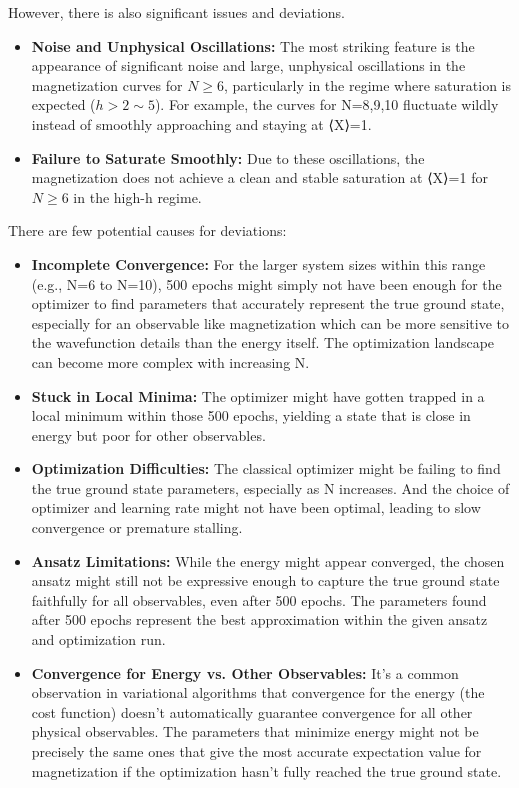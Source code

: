 \documentclass[a4paper]{article}
\begin{document}
However, there is also significant issues and deviations. 
\begin{itemize}
    \item \textbf{Noise and Unphysical Oscillations:} The most striking feature is the appearance of significant noise and large, unphysical oscillations in the magnetization curves for $N\geq 6$, particularly in the regime where saturation is expected ($h>2\sim5$). For example, the curves for N=8,9,10 fluctuate wildly instead of smoothly approaching and staying at ⟨X⟩=1.
    \item \textbf{Failure to Saturate Smoothly:} Due to these oscillations, the magnetization does not achieve a clean and stable saturation at ⟨X⟩=1 for $N\geq6$ in the high-h regime.
\end{itemize}

There are few potential causes for deviations: 
\begin{itemize}
    \item \textbf{Incomplete Convergence:} For the larger system sizes within this range (e.g., N=6 to N=10), 500 epochs might simply not have been enough for the optimizer to find parameters that accurately represent the true ground state, especially for an observable like magnetization which can be more sensitive to the wavefunction details than the energy itself. The optimization landscape can become more complex with increasing N.
    \item \textbf{Stuck in Local Minima:} The optimizer might have gotten trapped in a local minimum within those 500 epochs, yielding a state that is close in energy but poor for other observables.
    \item \textbf{Optimization Difficulties:} The classical optimizer might be failing to find the true ground state parameters, especially as N increases. And the choice of optimizer and learning rate might not have been optimal, leading to slow convergence or premature stalling.
    \item \textbf{Ansatz Limitations:} While the energy might appear converged, the chosen ansatz might still not be expressive enough to capture the true ground state faithfully for all observables, even after 500 epochs. The parameters found after 500 epochs represent the best approximation within the given ansatz and optimization run.
    \item \textbf{Convergence for Energy vs. Other Observables:} It's a common observation in variational algorithms that convergence for the energy (the cost function) doesn't automatically guarantee convergence for all other physical observables. The parameters that minimize energy might not be precisely the same ones that give the most accurate expectation value for magnetization if the optimization hasn't fully reached the true ground state.
\end{itemize}
\end{document}
